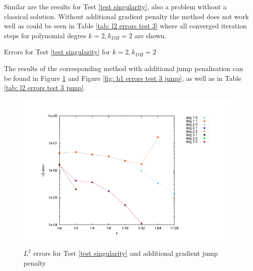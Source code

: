 Similar are the results for Test \ref{test singularity}, also a problem without a classical solution. Without additional gradient penalty the method does not work well as could be seen in Table \ref{tab: l2 errors test 3} where all converged iteration steps for polynomial degree $k=2, k_{DH}=2$ are shown.
\begin{table}[H]
		\centering
		\pgfplotstabletypeset[
		columns={iterations, l2error, h1error,N},
		    every row 0 column 0/.style={set content=init},
		]{\MAThreedegTwoTwo}
	\caption{Errors for Test \ref{test singularity} for $k=2, k_{DH}=2$}
	\label{tab: l2 errors test 3}
\end{table}

The results of the corresponding method with additional jump penalisation can be found in Figure \ref{fig: l2 errors test 3 jump} and Figure \ref{fig: h1 errors test 3 jump}, as well as in Table \ref{tab: l2 errors test 3 jump}. 

\begin{figure}[H]
	\centering
	\includegraphics[scale =0.45]{plots/MA3_Neilan_GradJump_l2.pdf}
	\caption{$L^2$ errors for Test \ref{test singularity} and additional gradient jump penalty}
	\label{fig: l2 errors test 3 jump}
\end{figure}

